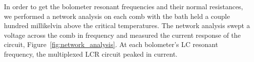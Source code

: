 %
%
%
%
%


In order to get the bolometer resonant frequencies and their normal resistances, we performed a network analysis on each comb with the bath held a couple hundred millikelvin above the critical temperatures.
The network analysis swept a voltage across the comb in frequency and measured the current response of the circuit, Figure~\ref{fig:network_analysis}. 
At each bolometer's LC resonant frequency, the multiplexed LCR circuit peaked in current. 

